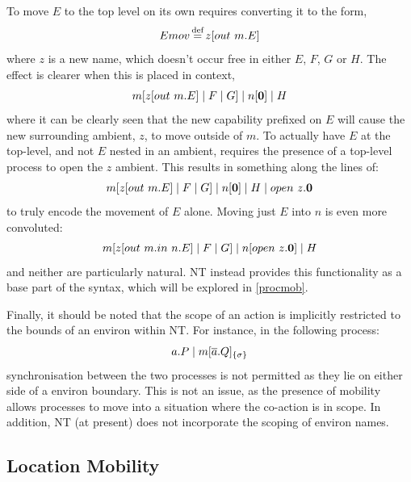 To move $E$ to the top level on its own requires converting it to the
form,
\begin{equation}
Emov \operatorname{\stackrel{\textrm{def}}{=}} z[out\ m.E]
\end{equation}
where $z$ is a new name, which doesn't occur free in either
$E$, $F$, $G$ or $H$.  The effect is clearer when this is placed in
context,
\begin{equation}
m[z[out\ m.E]\;|\;F\;|\;G]\;|\;n[\textbf{0}]\;|\;H
\end{equation}
where it can be clearly seen that the new capability prefixed
on $E$ will cause the new surrounding ambient, $z$, to move outside of
$m$.  To actually have $E$ at the top-level, and not $E$ nested in an
ambient, requires the presence of a top-level process to open the $z$
ambient.  This results in something along the lines of:
\begin{equation}
m[z[out\ m.E]\;|\;F\;|\;G]\;|\;n[\textbf{0}]\;|\;H\;|\;open\ z.\textbf{0}
\end{equation}
to truly encode the movement of $E$ alone.  Moving just $E$
into $n$ is even more convoluted:
\begin{equation}
m[z[out\ m.in\ n.E]\;|\;F\;|\;G]\;|\;n[open\ z.\textbf{0}]\;|\;H
\end{equation}
and neither are particularly natural.  NT instead provides
this functionality as a base part of the syntax, which will be explored
in \ref{procmob}.  

Finally, it should be noted that the scope of an action is implicitly
restricted to the bounds of an environ within NT.  For instance, in the
following process:
\begin{equation}
a.P \;|\; {m}[ \overline{a}.Q ]_{\{\sigma\}}
\end{equation}
synchronisation between the two processes is not permitted as
they lie on either side of a environ boundary.  This is not an issue,
as the presence of mobility allows processes to move into a situation
where the co-action is in scope.  In addition, NT (at present) does not
incorporate the scoping of environ names.

\subsection{Location Mobility}
\label{locmob}


